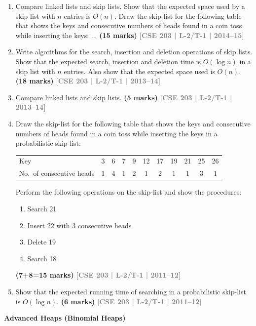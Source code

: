 \documentclass[12pt,a3paper]{article}
\newcommand{\yr}[1]{\hfill\textcolor{gray}{\small\textbf{[#1]}}}
\newcommand{\mk}[1]{\textcolor{orange!70!black}{\small\textbf{(#1 marks)}}}
\newcommand{\subtopic}[2]{%
  \vspace{10pt}
  \noindent\begin{tcolorbox}[colback=#1!8,colframe=#1,boxrule=0.6pt,arc=4pt,
    left=6pt,right=6pt,top=4pt,bottom=4pt]
    \small\bfseries\textcolor{#1}{#2}
  \end{tcolorbox}
  \vspace{2pt}
}
\begin{document}
\begin{enumerate}
\item Compare linked lists and skip lists. Show that the expected space used by a skip list with $n$ entries is $O(n)$. Draw the skip-list for the following table that shows the keys and consecutive numbers of heads found in a coin toss while inserting the keys:
...
\mk{15}
\yr{CSE 203 | L-2/T-1 | 2014--15}

\item Write algorithms for the search, insertion and deletion operations of skip lists. Show that the expected search, insertion and deletion time is $O(\log n)$ in a skip list with $n$ entries. Also show that the expected space used is $O(n)$. \mk{18}
\yr{CSE 203 | L-2/T-1 | 2013--14}


\item Compare linked lists and skip lists. \mk{5}
\yr{CSE 203 | L-2/T-1 | 2013--14}

\item Draw the skip-list for the following table that shows the keys and consecutive numbers of heads found in a coin toss while inserting the keys in a probabilistic skip-list:
\begin{center}
\begin{tabular}{lcccccccccc}
\toprule
Key & 3 & 6 & 7 & 9 & 12 & 17 & 19 & 21 & 25 & 26 \\
No.\ of consecutive heads & 1 & 4 & 1 & 2 & 1 & 2 & 1 & 1 & 3 & 1 \\
\bottomrule
\end{tabular}
\end{center}
Perform the following operations on the skip-list and show the procedures:
\begin{enumerate}
  \item Search 21
  \item Insert 22 with 3 consecutive heads
  \item Delete 19
  \item Search 18
\end{enumerate}
\mk{7+8=15}
\yr{CSE 203 | L-2/T-1 | 2011--12}

\item Show that the expected running time of searching in a probabilistic skip-list is $O(\log n)$. \mk{6}
\yr{CSE 203 | L-2/T-1 | 2011--12}


\end{enumerate}

\subtopic{cB}{Advanced Heaps (Binomial Heaps)}
\label{sub:s2-binheap}
\end{document}
